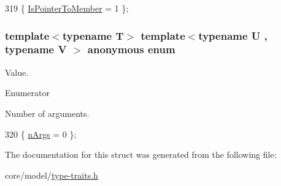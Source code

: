 \begin{DoxyCode}
319 \{ \hyperlink{structTypeTraits_1_1PtrToMemberTraits_3_01U_07V_1_1_5_08_07void_08_01const_01_01_4_a7d52bf1a56c79d867a3c686df58b08b2a37aeb7c74ec4b01354e9e1740c244a01}{IsPointerToMember} = 1    \};
\end{DoxyCode}
\subsubsection[{\texorpdfstring{anonymous enum}{anonymous enum}}]{\setlength{\rightskip}{0pt plus 5cm}template$<$typename T$>$ template$<$typename U , typename V $>$ anonymous enum}\hypertarget{structTypeTraits_1_1PtrToMemberTraits_3_01U_07V_1_1_5_08_07void_08_01const_01_01_4_a8dc54398f3d37adcc90194d306397278}{}\label{structTypeTraits_1_1PtrToMemberTraits_3_01U_07V_1_1_5_08_07void_08_01const_01_01_4_a8dc54398f3d37adcc90194d306397278}
Value. \begin{Desc}
\item[Enumerator]\par
\begin{description}
\item[{\em 
n\+Args\hypertarget{structTypeTraits_1_1PtrToMemberTraits_3_01U_07V_1_1_5_08_07void_08_01const_01_01_4_a8dc54398f3d37adcc90194d306397278a9b0973dd3356f1279a1c27d341b7a62a}{}\label{structTypeTraits_1_1PtrToMemberTraits_3_01U_07V_1_1_5_08_07void_08_01const_01_01_4_a8dc54398f3d37adcc90194d306397278a9b0973dd3356f1279a1c27d341b7a62a}
}]Number of arguments. \end{description}
\end{Desc}

\begin{DoxyCode}
320 \{ \hyperlink{structTypeTraits_1_1PtrToMemberTraits_3_01U_07V_1_1_5_08_07void_08_01const_01_01_4_a8dc54398f3d37adcc90194d306397278a9b0973dd3356f1279a1c27d341b7a62a}{nArgs} = 0                \};
\end{DoxyCode}


The documentation for this struct was generated from the following file\+:\begin{DoxyCompactItemize}
\item 
core/model/\hyperlink{type-traits_8h}{type-\/traits.\+h}\end{DoxyCompactItemize}
